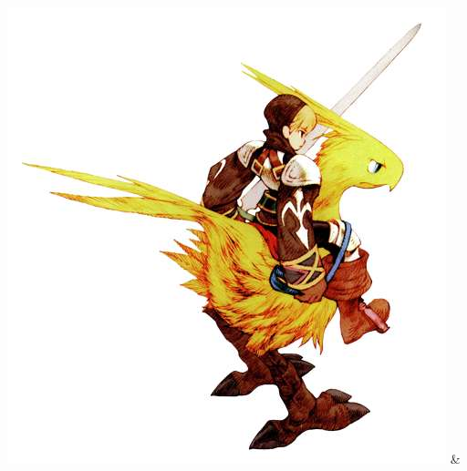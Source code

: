 \includegraphics[width=\columnwidth]{./art/worldbook/chocoborider.jpg}
%
\clearpage
%
%
\newcommand{\nlwb}{\vspace{0.2cm}\\}
%
{ & }
